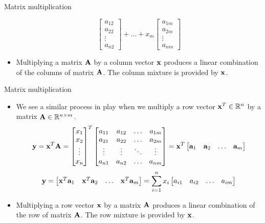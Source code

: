 \documentclass[aspectratio=169]{beamer}
\def\mf{\ensuremath\mathbf}
\begin{document}
\begin{frame}[t]{Matrix multiplication}
\begin{itemize}
\[\begin{bmatrix}
a_{12} \\ a_{22} \\ \vdots \\ a_{n2}
\end{bmatrix} + \ldots + x_m \begin{bmatrix}
a_{1m} \\ a_{2m} \\ \vdots \\ a_{nm}
\end{bmatrix} \]
\item Multiplying a matrix $\mf{A}$ by a column vector $\mf{x}$ produces a linear combination of the columns of matrix $\mf{A}$. The column mixture is provided by $\mf{x}$.
\end{itemize}
\end{frame}

\begin{frame}[t]{Matrix multiplication}
\begin{itemize}
\item We see a similar process in play when we multiply a row vector $\mf{x}^T \in \mathbb{R}^{n}$ by a matrix $\mf{A} \in \mathbb{R}^{n \times m}$.
\[ \mf{y} = \mf{x}^T\mf{A} = \begin{bmatrix}
x_1\\ x_2 \\ \vdots \\ x_n
\end{bmatrix}^T\begin{bmatrix}
a_{11} & a_{12} & \ldots & a_{1m} \\
a_{21} & a_{22} & \ldots & a_{2m} \\
\vdots & \vdots & \ddots & \vdots \\
a_{n1} & a_{n2} & \ldots & a_{nm} \\
\end{bmatrix} = \mf{x}^T\begin{bmatrix}
\mf{a}_1 & \mf{a}_2 & \ldots & \mf{a}_m
\end{bmatrix} \]
\[ \mf{y} = \begin{bmatrix}
\mf{x}^T\mf{a}_1 & \mf{x}^T\mf{a}_2 & \ldots & \mf{x}^T\mf{a}_m\end{bmatrix} = \sum_{i=1}^{n}x_i\begin{bmatrix}
a_{i1} & a_{i2} & \ldots & a_{im}\end{bmatrix} \]
\item Multiplying a row vector $\mf{x}$ by a matrix $\mf{A}$ produces a linear combination of the row of matrix $\mf{A}$. The row mixture is provided by $\mf{x}$.
\end{itemize}
\end{frame}
\end{document}
